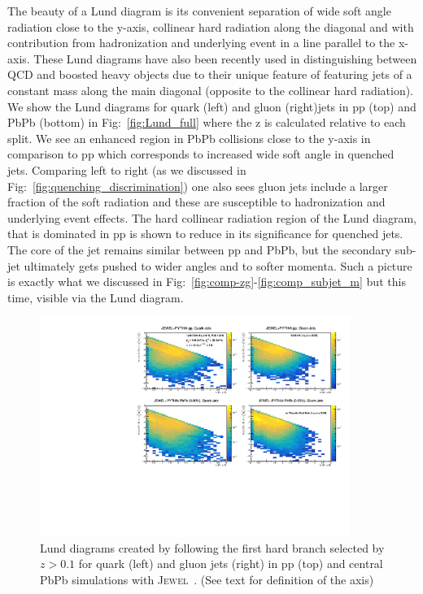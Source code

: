\documentclass[notoc]{JHEP3}
\newcommand{\jw}{\textsc{Jewel}~}
\begin{document}
The beauty of a Lund diagram is its convenient separation of wide soft angle radiation close to the y-axis, collinear hard radiation along the diagonal and with contribution from hadronization and underlying event in a line parallel to the x-axis. These Lund diagrams have also been recently used in distinguishing between QCD and boosted heavy objects due to their unique feature of featuring jets of a constant mass along the main diagonal (opposite to the collinear hard radiation). We show the Lund diagrams for quark (left) and gluon (right)jets in pp (top) and PbPb (bottom) in Fig:~\ref{fig:Lund_full} where the z is calculated relative to each split. We see an enhanced region in PbPb collisions close to the y-axis in comparison to pp which corresponds to increased wide soft angle in quenched jets. Comparing left to right (as we discussed in Fig:~\ref{fig:quenching_discrimination}) one also sees gluon jets include a larger fraction of the soft radiation and these are susceptible to hadronization and underlying event effects. The hard collinear radiation region of the Lund diagram, that is dominated in pp is shown to reduce in its significance for quenched jets. The core of the jet remains similar between pp and PbPb, but the secondary sub-jet ultimately gets pushed to wider angles and to softer momenta. Such a picture is exactly what we discussed in Fig:~\ref{fig:comp-zg}-\ref{fig:comp_subjet_m} but this time, visible via the Lund diagram.

\begin{figure}[t]
	   \centering
	   \includegraphics[width=0.9\textwidth]{plots/Individual_LundDiagrams_zrel_hardBranch.pdf}
	   \caption{Lund diagrams created by following the first hard branch selected by $z>0.1$ for quark (left) and gluon jets (right) in pp (top) and central PbPb simulations with \jw. (See text for definition of the axis)}
\label{fig:Lund_hard}
\end{figure}
\end{document}
